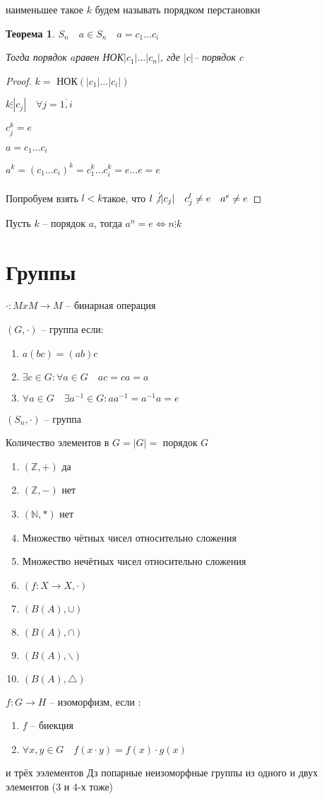 \documentclass[11pt,a4paper]{book}
\newtheorem{Th}{Теорема}[chapter]
\begin{document}
наименьшее такое $k$ будем называть порядком перстановки 

\begin{Th}
	$S_n \quad a \in S_n \quad a = c_1\hdots c_i$
	
	Тогда порядок $a$равен НОК$|c_1|\dots|c_n|$, где $|c|$-- порядок $c$ 
\end{Th}

\begin{proof}
	$k = $ НОК$(|c_1|\hdots|c_i|)$
	
	$k\vdots |c_j|\quad \forall j = \overline{1, i}$
	
	$c_j^k = e$
	
	$a = c_1\hdots c_i$
	
	$a^k = (c_1\hdots c_i)^k=c_1^k\hdots c_i^k=e\hdots e = e$
	
	Попробуем взять $l<k$такое, что 
	$l\not\vdots |c_j|\quad c_j^l\neq e\quad a^e \neq e$
\end{proof}

Пусть $k$ -- порядок $a$, тогда $a^n=e\Longleftrightarrow n \vdots k$

\section{Группы}
$\cdot : MxM \to M$ -- бинарная операция

$(G, \cdot)$ -- группа если:
\begin{enumerate}
	\item $a(bc) = (ab)c$
	\item $\exists c \in G: \forall a \in G \quad ac = ca = a$
	\item $\forall a \in G \quad \exists a^{-1}\in G: aa^{-1}= a^{-1}a = e$
\end{enumerate}

$(S_n, \cdot)$ -- группа

Количество элементов в $G = |G| = $ порядок $G$
\begin{enumerate}
	\item $(\mathds{Z}, +)$ да
	\item $(\mathds{Z}, -)$ нет
	\item $(\mathds{N}, *)$ нет
	\item Множество чётных чисел относительно сложения 
	\item Множество нечётных чисел относительно сложения
	\item $(f:X\to X, \cdot)$
	\item $(B(A), \cup)$
	\item $(B(A), \cap)$
	\item $(B(A), \backslash)$
	\item $(B(A), \triangle)$
\end{enumerate}

$f: G\to H$ -- изоморфизм, если :
\begin{enumerate}
	\item $f$ -- биекция
	\item $\forall x, y \in G\quad f(x\cdot y) = f(x)\cdot g(x)$
\end{enumerate}

 и трёх ээлементов
Дз
попарные неизоморфные группы из одного и двух элементов (3 и 4-х тоже)
\end{document}
